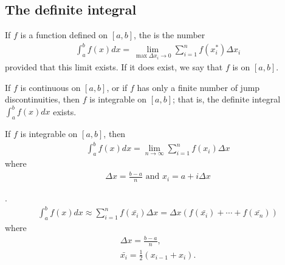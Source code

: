 \documentclass{article}
\begin{document}
\subsection{The definite integral}
\begin{definition}
    If $f$ is a function defined on $[a,b]$, the  is the number
    \begin{align*}
        \int_a^b f(x)dx=\lim_{\max \Delta x_i\to0}\sum_{i=1}^n f(x_i^*)\Delta x_i
    \end{align*}
    provided that this limit exists. If it does exist, we say that $f$ is  on $[a,b]$.
\end{definition}
\begin{theorem}
    If $f$ is continuous on $[a,b]$, or if $f$ has only a finite number of jump discontinuities, then $f$ is integrable on $[a,b]$; that is, the definite integral $\int_a^b f(x)dx$ exists.
\end{theorem}
\begin{theorem}
    If $f$ is integrable on $[a,b]$, then \begin{align*}
        \int_a^b f(x)dx = \lim_{n\to\infty}\sum_{i=1}^nf(x_i)\Delta x
    \end{align*}
    where \begin{align*}
    \Delta x = \frac{b-a}{n} \text{ and } x_i=a+i\Delta x
    \end{align*}
\end{theorem}
\begin{theorem}
    .
    \begin{align*}
        \int_a^bf(x)dx \approx \sum_{i=1}^nf(\bar{x_i})\Delta x = \Delta x (f(\bar{x_i})+\cdots+f(\bar{x_n}))
    \end{align*}
    where
    \begin{align*}
        \Delta x = \frac{b-a}{n},\\
        \bar{x_i} = \frac{1}{2}(x_{i-1}+x_i).
    \end{align*}
\end{theorem}
\end{document}
